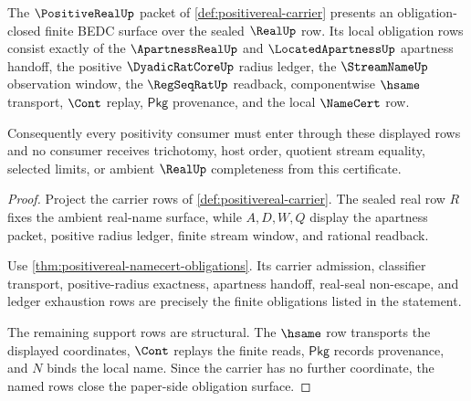 \begin{theorem}
\label{thm:positive-real-obligation-closure}
The $\PositiveRealUp$ packet of \autoref{def:positivereal-carrier} presents an
obligation-closed finite BEDC surface over the sealed $\RealUp$ row. Its local
obligation rows consist exactly of the $\ApartnessRealUp$ and
$\LocatedApartnessUp$ apartness handoff, the positive $\DyadicRatCoreUp$ radius
ledger, the $\StreamNameUp$ observation window, the $\RegSeqRatUp$ readback,
componentwise $\hsame$ transport, $\Cont$ replay, $\mathsf{Pkg}$ provenance,
and the local $\NameCert$ row.

Consequently every positivity consumer must enter through these displayed rows
and no consumer receives trichotomy, host order, quotient stream equality,
selected limits, or ambient $\RealUp$ completeness from this certificate.
\end{theorem}
\begin{proof}
Project the carrier rows of \autoref{def:positivereal-carrier}. The sealed
real row $R$ fixes the ambient real-name surface, while $A,D,W,Q$ display the
apartness packet, positive radius ledger, finite stream window, and rational
readback.

Use \autoref{thm:positivereal-namecert-obligations}. Its carrier admission,
classifier transport, positive-radius exactness, apartness handoff,
real-seal non-escape, and ledger exhaustion rows are precisely the finite
obligations listed in the statement.

The remaining support rows are structural. The $\hsame$ row transports the
displayed coordinates, $\Cont$ replays the finite reads, $\mathsf{Pkg}$ records
provenance, and $N$ binds the local name. Since the carrier has no further
coordinate, the named rows close the paper-side obligation surface.
\end{proof}

